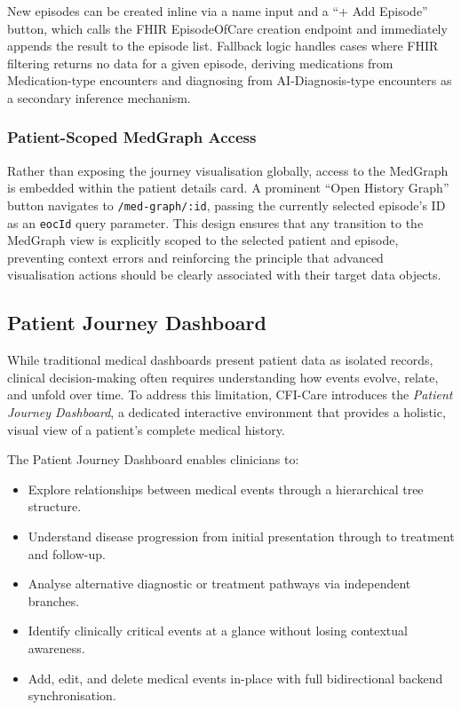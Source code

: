 New episodes can be created inline via a name input and a ``+ Add Episode''
button, which calls the FHIR EpisodeOfCare creation endpoint and immediately
appends the result to the episode list. Fallback logic handles cases where FHIR
filtering returns no data for a given episode, deriving medications from
Medication-type encounters and diagnosing from AI-Diagnosis-type encounters as
a secondary inference mechanism.

\subsubsection{Patient-Scoped MedGraph Access}

Rather than exposing the journey visualisation globally, access to the MedGraph
is embedded within the patient details card. A prominent ``Open History Graph''
button navigates to \texttt{/med-graph/:id}, passing the currently selected
episode's ID as an \texttt{eocId} query parameter. This design ensures that
any transition to the MedGraph view is explicitly scoped to the selected patient
and episode, preventing context errors and reinforcing the principle that
advanced visualisation actions should be clearly associated with their target
data objects.

\subsection{Patient Journey Dashboard}

While traditional medical dashboards present patient data as isolated records,
clinical decision-making often requires understanding how events evolve, relate,
and unfold over time. To address this limitation, CFI-Care introduces the
\textit{Patient Journey Dashboard}, a dedicated interactive environment that
provides a holistic, visual view of a patient's complete medical history.

The Patient Journey Dashboard enables clinicians to:
\begin{itemize}
    \item Explore relationships between medical events through a hierarchical
          tree structure.
    \item Understand disease progression from initial presentation through to
          treatment and follow-up.
    \item Analyse alternative diagnostic or treatment pathways via independent
          branches.
    \item Identify clinically critical events at a glance without losing
          contextual awareness.
    \item Add, edit, and delete medical events in-place with full
          bidirectional backend synchronisation.
\end{itemize}

